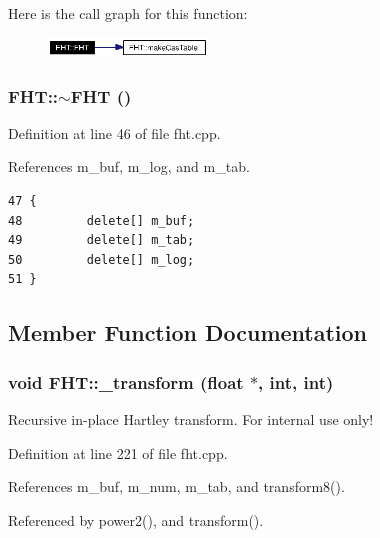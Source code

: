 Here is the call graph for this function:\begin{figure}[H]
\begin{center}
\leavevmode
\includegraphics[width=120pt]{classFHT_FHTa0_cgraph}
\end{center}
\end{figure}
\subsubsection{\setlength{\rightskip}{0pt plus 5cm}FHT::$\sim${\bf FHT} ()}\label{classFHT_FHTa1}




Definition at line 46 of file fht.cpp.

References m\_\-buf, m\_\-log, and m\_\-tab.



\footnotesize\begin{verbatim}47 {
48         delete[] m_buf;
49         delete[] m_tab;
50         delete[] m_log;
51 }
\end{verbatim}\normalsize 


\subsection{Member Function Documentation}
\subsubsection{\setlength{\rightskip}{0pt plus 5cm}void FHT::\_\-transform (float $\ast$, int, int)\hspace{0.3cm}{\tt  [private]}}\label{classFHT_FHTd1}


Recursive in-place Hartley transform. For internal use only!

Definition at line 221 of file fht.cpp.

References m\_\-buf, m\_\-num, m\_\-tab, and transform8().

Referenced by power2(), and transform().



